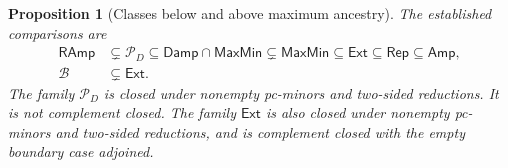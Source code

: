\documentclass[11pt]{article}
\newtheorem{proposition}{Proposition}[section]
\theoremstyle{definition}
\newcommand{\Amp}{\mathsf{Amp}}
\newcommand{\MaxMin}{\mathsf{MaxMin}}
\newcommand{\Damp}{\mathsf{Damp}}
\newcommand{\RAmp}{\mathsf{RAmp}}
\newcommand{\Rep}{\mathsf{Rep}}
\begin{document}
\begin{proposition}[Classes below and above maximum ancestry]
\label{prop:maxmin-neighbors}
The established comparisons are
\begin{align}
 \RAmp&\subsetneq\mathcal P_D
 \subseteq\Damp\cap\MaxMin
 \subsetneq\MaxMin
 \subseteq\mathsf{Ext}\subseteq\Rep\subseteq\Amp,
 \label{eq:maxmin-neighbor-chain}\\
 \mathcal B&\subsetneq\mathsf{Ext}.
 \label{eq:both-extension-strict}
\end{align}
The family $\mathcal P_D$ is closed under nonempty pc-minors and two-sided
reductions. It is not complement closed. The family $\mathsf{Ext}$ is
also closed under nonempty pc-minors and two-sided reductions, and is
complement closed with the empty boundary case adjoined.
\end{proposition}
\end{document}
